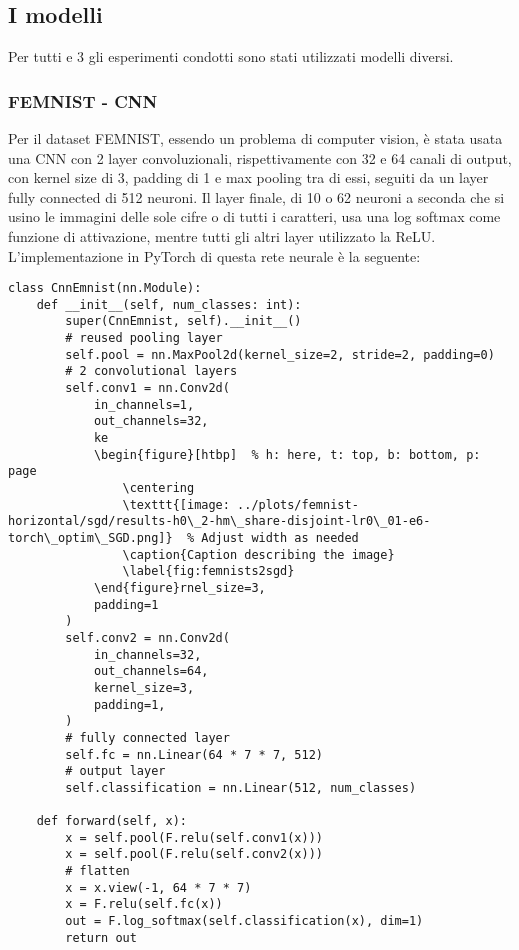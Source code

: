 \subsection{I modelli}
Per tutti e 3 gli esperimenti condotti sono stati utilizzati modelli 
diversi.

\subsubsection{FEMNIST - CNN}
Per il dataset FEMNIST, essendo un problema di computer vision, è stata 
usata una CNN con 2 layer convoluzionali, rispettivamente con 32 e 
64 canali di output, con kernel size di 3, padding di 1
e max pooling tra di essi, seguiti da un layer fully connected 
di 512 neuroni. Il layer finale, di 10 o 62 neuroni a seconda che si 
usino le immagini delle sole cifre o di tutti i caratteri, usa una 
log softmax come funzione di attivazione, mentre tutti gli altri layer 
utilizzato la ReLU. L'implementazione in PyTorch di questa rete neurale
è la seguente:

\begin{lstlisting}
class CnnEmnist(nn.Module):
    def __init__(self, num_classes: int):
        super(CnnEmnist, self).__init__()
        # reused pooling layer
        self.pool = nn.MaxPool2d(kernel_size=2, stride=2, padding=0)
        # 2 convolutional layers
        self.conv1 = nn.Conv2d(
            in_channels=1,
            out_channels=32,
            ke
            \begin{figure}[htbp]  % h: here, t: top, b: bottom, p: page
                \centering
                \texttt{[image: ../plots/femnist-horizontal/sgd/results-h0\_2-hm\_share-disjoint-lr0\_01-e6-torch\_optim\_SGD.png]}  % Adjust width as needed
                \caption{Caption describing the image}
                \label{fig:femnists2sgd}
            \end{figure}rnel_size=3,
            padding=1
        )
        self.conv2 = nn.Conv2d(
            in_channels=32,
            out_channels=64,
            kernel_size=3,
            padding=1,
        )
        # fully connected layer
        self.fc = nn.Linear(64 * 7 * 7, 512)
        # output layer
        self.classification = nn.Linear(512, num_classes)

    def forward(self, x):
        x = self.pool(F.relu(self.conv1(x)))
        x = self.pool(F.relu(self.conv2(x)))
        # flatten
        x = x.view(-1, 64 * 7 * 7)
        x = F.relu(self.fc(x))
        out = F.log_softmax(self.classification(x), dim=1)
        return out
\end{lstlisting}


